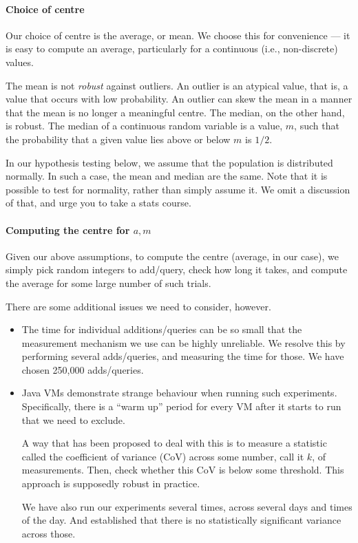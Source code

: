 \paragraph{Choice of centre} Our choice of centre is the
average, or mean. We choose this for convenience --- it is
easy to compute an average, particularly for a continuous
(i.e., non-discrete) values.

The mean is not \emph{robust} against outliers.
An outlier is an atypical value, that is, a value that occurs
with low probability. An outlier can skew the mean in a manner
that the mean is no longer a meaningful centre.
The median, on the other hand, is robust.
The median of a continuous random variable is a value, $m$,
such that the probability that a given value lies above
or below $m$ is $1/2$.

In our hypothesis testing below, we assume that the population
is distributed normally. In such a case, the mean and median
are the same. Note that it is possible to test for normality,
rather than simply assume it. We omit a discussion of that, and
urge you to take a stats course.

\paragraph{Computing the centre for $a, m$} Given our above
assumptions, to compute the centre (average, in our case), we
simply pick random integers to add/query, check how long it
takes, and compute the average for some large number of such
trials.

There are some additional issues we need to consider, however.

\begin{itemize}
    \item The time for individual additions/queries can be
	so small that the measurement mechanism we use can
	be highly unreliable. We resolve this by performing
	several adds/queries, and measuring the time for those.
	We have chosen 250,000 adds/queries.

    \item Java VMs demonstrate strange behaviour when running
	such experiments. Specifically, there is a ``warm up''
	period for every VM after it starts to run
	that we need to exclude.

	A way that has been proposed to deal with this \cite{xxx}
	is to measure a statistic called the coefficient
	of variance (CoV) across some number, call it
	$k$, of measurements. Then, check whether this
	CoV is below some threshold. This approach is
	supposedly robust in practice.

	We have also run our experiments several times, across
	several days and times of the day. And established that
	there is no statistically significant variance across
	those.
\end{itemize}

